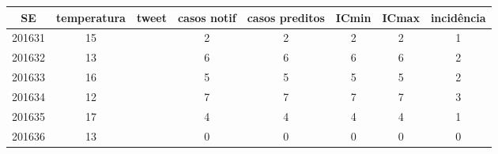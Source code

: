 \begin{tabular}{c|ccccccc}
  \hline
SE & temperatura & tweet & casos notif & casos preditos & ICmin & ICmax & incidência \\ 
  \hline
201631 & 15 &  & 2 & 2 & 2 & 2 & 1 \\ 
  201632 & 13 &  & 6 & 6 & 6 & 6 & 2 \\ 
  201633 & 16 &  & 5 & 5 & 5 & 5 & 2 \\ 
  201634 & 12 &  & 7 & 7 & 7 & 7 & 3 \\ 
  201635 & 17 &  & 4 & 4 & 4 & 4 & 1 \\ 
  201636 & 13 &  & 0 & 0 & 0 & 0 & 0 \\ 
   \hline
\end{tabular}
